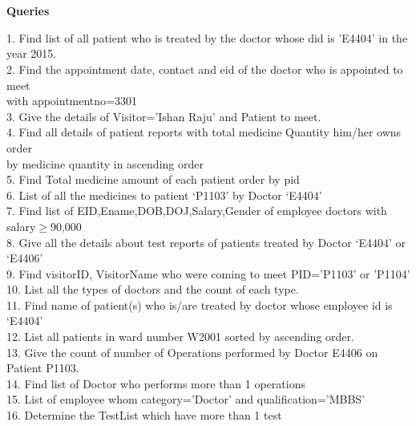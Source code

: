 \documentclass{turabian-researchpaper}
\begin{document}
\section{}
\begin{flushleft}
\textbf{\large Queries}
\end{flushleft}
\begin{flushleft}
1. Find list of all patient who is treated by the doctor whose did is 'E4404'  in the year 2015.\\
2. Find the appointment date, contact and eid of the doctor who is appointed to meet\\ \hspace{4mm} with appointmentno=3301\\
3. Give the details of Visitor=’Ishan Raju’ and Patient to meet.\\
4. Find all details of patient reports with total medicine Quantity him/her owns order\\ \hspace{4mm} by medicine quantity in ascending order\\
5. Find Total medicine amount of each patient order by pid\\
6. List of all the medicines to patient ‘P1103’ by Doctor ‘E4404’\\
7. Find list of EID,Ename,DOB,DOJ,Salary,Gender of employee doctors with\\
 \hspace{4mm} salary$\geq$90,000\\
8. Give all the details about test reports of patients treated by Doctor ‘E4404’ or ‘E4406’\\
9. Find visitorID, VisitorName who were coming to meet PID='P1103' or 'P1104'\\
10. List all the types of doctors and the count of each type. \\
11. Find name  of patient(s) who is/are treated by doctor whose  
employee id is ‘E4404’\\
12. List all patients in ward number W2001 sorted by ascending 
order.\\
13. Give the count of number of Operations performed by   
Doctor E4406 on Patient P1103.\\
14. Find list of Doctor who performs more than 1 operations \\
15. List of  employee whom category=’Doctor’ and 
qualification=’MBBS’ \\
16. Determine the TestList which have more than 1 test\\
\end{flushleft}

\clearpage
\end{document}

